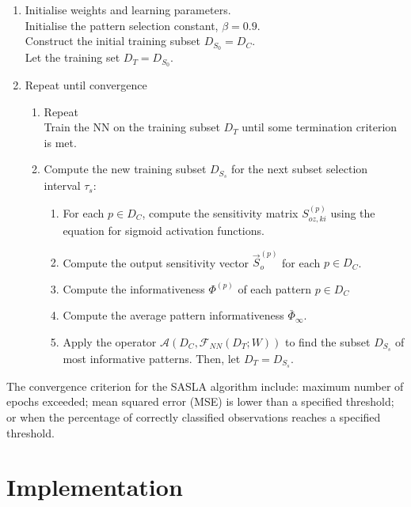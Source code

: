 \documentclass[conference]{IEEEtran}
\begin{document}
	\begin{enumerate}
		\item Initialise weights and learning parameters. \\
		Initialise the pattern selection constant, $\beta=0.9$. \\
		Construct the initial training subset $D_{S_0} = D_C$. \\
		Let the training set $D_T=D_{S_0}$.\\
		\item Repeat until convergence
		\begin{enumerate}
		\item Repeat \\
		Train the NN on the training subset $D_T$ until some termination criterion is met.
		\item Compute the new training subset $D_{S_s}$ for the next subset selection interval $\tau_s$:
		\begin{enumerate}
		\item For each $p\in D_C$, compute the sensitivity matrix $S_{oz,ki}^{(p)}$ using the equation for sigmoid activation functions.
		\item Compute the output sensitivity vector $\vec{S}_o^{(p)}$ for each $p\in D_C$.
		\item Compute the informativeness $\Phi^{(p)}$ of each pattern $p\in D_C$
		\item Compute the average pattern informativeness $\bar{\Phi}_\infty$.
		\item Apply the operator $\mathcal{A}(D_C, \mathcal{F}_{NN}(D_T;W))$ to find the subset $D_{S_s}$ of most informative patterns. Then, let $D_T=D_{S_s}$.
		\end{enumerate}
		\end{enumerate}
	\end{enumerate}
	The convergence criterion for the SASLA algorithm include: maximum number of epochs exceeded; mean squared error (MSE) is lower than a specified threshold; or when the percentage of correctly classified observations reaches a specified threshold.
	
	\section{Implementation}\label{I}
	
\end{document}
